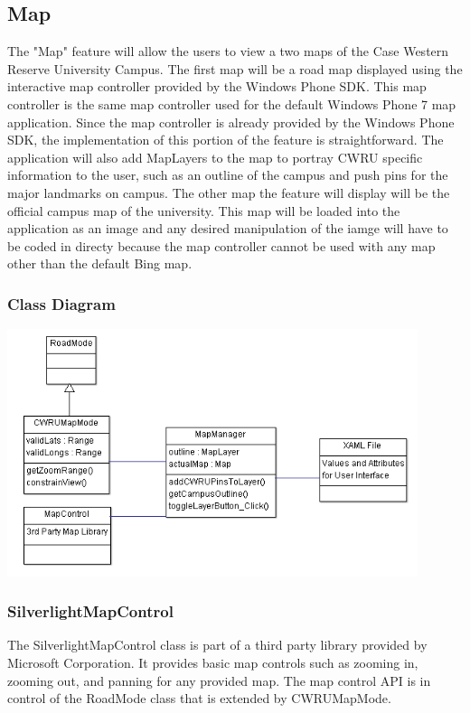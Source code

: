 \documentclass[pdftex,12pt,letter]{article}
\begin{document}
\subsection{Map}
The "Map" feature will allow the users to view a two maps of the Case Western Reserve University Campus. The first map will be a road map displayed using the interactive map controller provided by the Windows Phone SDK. This map controller is the same map controller used for the default Windows Phone 7 map application. Since the map controller is already provided by the Windows Phone SDK, the implementation of this portion of the feature is straightforward. The application will also add MapLayers to the map to portray CWRU specific information to the user, such as an outline of the campus and push pins for the major landmarks on campus. The other map the feature will display will be the official campus map of the university.  This map will be loaded into the application as an image and any desired manipulation of the iamge will have to be coded in directy because the map controller cannot be used with any map other than the default Bing map.
\subsubsection{Class Diagram}
\includegraphics[width=120mm]{MapCD.png}
\subsubsection{SilverlightMapControl}
The SilverlightMapControl class is part of a third party library provided by Microsoft Corporation. It provides basic map controls such as zooming in, zooming out, and panning for any provided map. The map control API is in control of the RoadMode class that is extended by CWRUMapMode.
\end{document}
